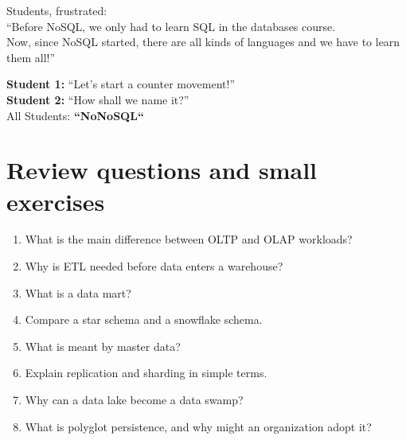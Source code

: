 \documentclass[11pt,a4paper,openany]{book}
\newcommand{\stick}[3]{\begin{scope}[shift={(#1,#2)}]\draw[line width=0.9pt] (0,0.25) circle (0.18);\node[font=\scriptsize] at (0,0.25) {#3};\draw[line width=0.9pt] (0,0.07) -- (0,-0.55);\draw[line width=0.9pt] (-0.32,-0.15) -- (0.32,-0.15);\draw[line width=0.9pt] (0,-0.55) -- (-0.28,-0.95);\draw[line width=0.9pt] (0,-0.55) -- (0.28,-0.95);\end{scope}}
\begin{document}
\newpage
\begin{jokebox}
\small
Students, frustrated: \\
``Before NoSQL, we only had to learn SQL in the databases course.\\
Now, since NoSQL started, there are all kinds of languages and we have to learn them all!''

\vspace{0.6em}

\textbf{Student 1:} ``Let's start a counter movement!''\\[0.2em]
\textbf{Student 2:} ``How shall we name it?''\\[0.2em]
All Students: \textbf{``NoNoSQL``}

\vspace{0.6em}


\centering
{}

\end{jokebox}

\section{Review questions and small exercises}
\begin{enumerate}
\item What is the main difference between OLTP and OLAP workloads?
\item Why is ETL needed before data enters a warehouse?
\item What is a data mart?
\item Compare a star schema and a snowflake schema.
\item What is meant by master data?
\item Explain replication and sharding in simple terms.
\item Why can a data lake become a data swamp?
\item What is polyglot persistence, and why might an organization adopt it?
\end{enumerate}
\end{document}
